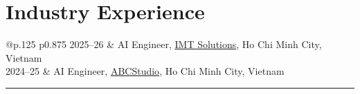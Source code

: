 
\section*{Industry Experience}
\label{exp_industry}
\begin{longtable}[l]{@{}p{.125\textwidth} p{0.875\textwidth}}
  2025--26 & AI Engineer, \href{https://imt-soft.com/}{IMT Solutions}, Ho Chi Minh City, Vietnam \\
  2024--25 & AI Engineer, \href{https://abcstudio.co/}{ABCStudio}, Ho Chi Minh City, Vietnam \\
\end{longtable}

\centering
\rule{0.25\linewidth}{0.4pt}\\


